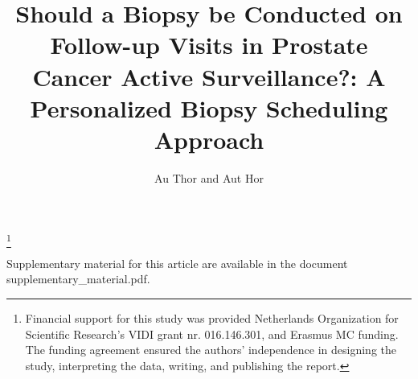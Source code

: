 \documentclass[Review,sagev,times]{sagej}
\begin{document}

\title{Should a Biopsy be Conducted on Follow-up Visits in Prostate Cancer Active Surveillance?: A Personalized Biopsy Scheduling Approach}

\author{Au Thor and Aut Hor}







\maketitle

\footnote{Financial support for this study was provided Netherlands Organization for Scientific Research's VIDI grant nr. 016.146.301, and Erasmus MC funding. The funding agreement ensured the authors’ independence in designing the study, interpreting the data, writing, and publishing the report.}
\thefootnote








\begin{sm}
Supplementary material for this article are available in the document supplementary\_material.pdf.
\end{sm}



\end{document}
